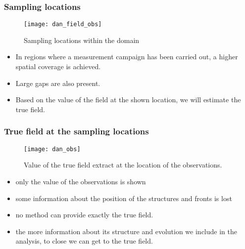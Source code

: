 
\begin{frame}
\frametitle{Sampling locations}

\begin{figure}[H]
\centerline{\texttt{[image: dan\_field\_obs]}}
\caption{Sampling locations within the domain}
\label{dan_field_obs}
\end{figure}

\vspace{-1cm}

\begin{itemize}
\item In regions where a measurement campaign has been
carried out, a higher spatial coverage is achieved. 
\item Large gaps are also present. 
\item Based on the value of the field at the shown location,
we will estimate the true field.
\end{itemize}

\end{frame}


\begin{frame}
\frametitle{True field at the sampling locations}

\begin{figure}[H] 
\centerline{\texttt{[image: dan\_obs]}}
\caption{Value of the true field extract at the location of the
  observations.}
\label{dan_obs}
\end{figure}

\vspace{-1cm}

\begin{itemize} 
\item only the value of the observations is shown
\item  some information about the position of the
structures and fronts is lost 
\item no method can provide exactly the true field.
\item the
more information about its structure and evolution we include in the
analysis, to close we can get to the true field.
\end{itemize}

\end{frame}

